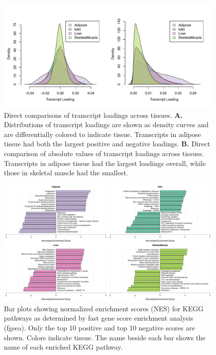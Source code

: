 \documentclass[
]{article}
\begin{document}
\begin{figure}[ht!]
\includegraphics[width=\textwidth]{Figures/Supp_Fig_transcript_load_comparison.pdf} 
\caption{Direct comparisons of transcript loadings across tissues. \textbf{A.}
Distributions of transcript loadings are shown as density curves and are 
differentially colored to indicate tissue. Transcripts in adipose tissue had 
both the largest positive and negative loadings. \textbf{B.} Direct comparison
of absolute values of transcript loadings across tissues. Transcripts in adipose
tissue had the largest loadings overall, while those in skeletal muscle had the
smallest.
}
\label{fig:transcript_loading_comparison}
\end{figure}

\begin{figure}[ht!]
\includegraphics[width=\textwidth]{Figures/Supp_Fig_enrichments_KEGG.pdf} 
\caption{Bar plots showing normalized enrichment scores (NES) for KEGG 
pathways as determined by fast gene score enrichment analysis (fgsea). 
Only the top 10 positive and top 10 negative scores are shown. Colors 
indicate tissue. The name beside each bar shows the name of each enriched 
KEGG pathway.
}
\label{fig:top_enrich_kegg}
\end{figure}
\end{document}
